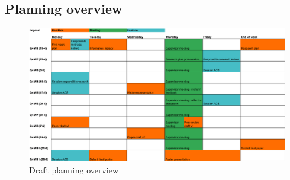 \documentclass[english]{article}
\begin{document}
\subsection*{Planning overview}
\begin{figure}[h]
	\includegraphics[width=\linewidth]{Planning}
	\centering
	\caption{Draft planning overview}
\end{figure}


\printbibliography

\end{document}

